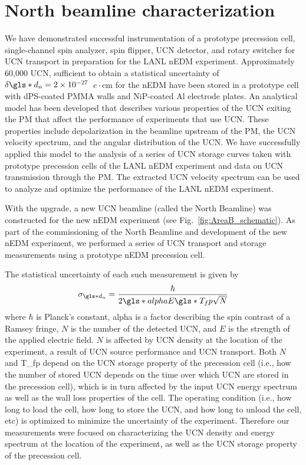 
\chapter{North beamline characterization}
\label{chap:north_beamline_paper}


We have demonstrated successful instrumentation of a prototype precession cell, single-channel spin analyzer, spin flipper, UCN detector, and rotary switcher for UCN transport in preparation for the LANL nEDM experiment. Approximately 60,000 UCN, sufficient to obtain a statistical uncertainty of $\delta \gls*{d_n} = 2\times 10^{-27}$~$e\cdot\text{cm}$ for the nEDM have been stored in a prototype cell with dPS-coated PMMA walls and NiP-coated Al electrode plates. An analytical model has been developed that describes various properties of the UCN exiting the PM that affect the performance of experiments that use UCN. These properties include depolarization in the beamline upstream of the PM, the UCN velocity spectrum, and the angular distribution of the UCN. We have successfully applied this model to the analysis of a series of UCN storage curves taken with prototype precession cells of the LANL nEDM experiment and data on UCN transmission through the PM. The extracted UCN velocity spectrum can be used to analyze and optimize the performance of the LANL nEDM experiment. 

With the upgrade, a new UCN beamline (called the North Beamline) was constructed for the new nEDM experiment (see Fig.~\ref{fig:AreaB_schematic}). As part of the commissioning of the North Beamline and development of the new nEDM experiment, we performed a series of UCN transport and storage measurements using a prototype nEDM precession cell. 

 The statistical uncertainty of each such measurement is given by 
%
\begin{gather}
    \sigma_{\gls*{d_n}} = \frac{\hbar}{2\gls*{alpha} E \gls*{T_fp} \sqrt{N}}
\end{gather}
%
where $\hbar$ is Planck’s constant, \gls*{alpha} is a factor describing the spin contrast of a Ramsey fringe, $N$ is the number of the detected UCN, and $E$ is the strength of the applied electric field. $N$ is affected by UCN density at the location of the experiment, a result of UCN source performance and UCN transport. Both $N$ and \gls*{T_fp} depend on the UCN storage property of the precession cell (i.e., how the number of stored UCN depends on the time over which UCN are stored in the precession cell), which is in turn affected by the input UCN energy spectrum as well as the wall loss properties of the cell. The operating condition (i.e., how long to load the cell, how long to store the UCN, and how long to unload the cell, etc) is optimized to minimize the uncertainty of the experiment. Therefore our measurements were focused on characterizing the UCN density and energy spectrum at the location of the experiment, as well as the UCN storage property of the precession cell. 

